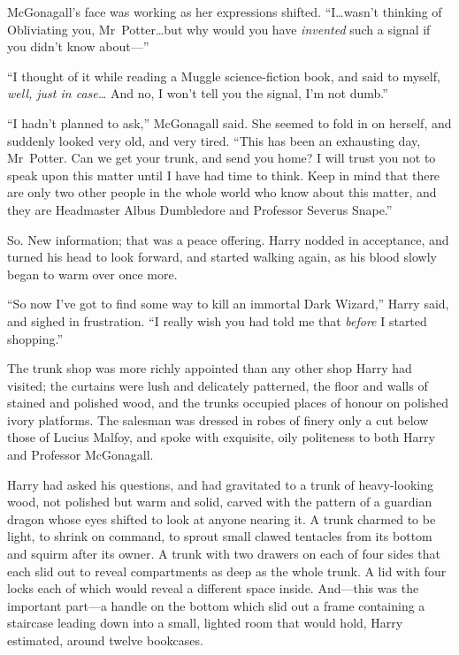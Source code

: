 McGonagall’s face was working as her expressions shifted. “I…wasn’t thinking of Obliviating you, Mr~Potter…but why would you have \emph{invented} such a signal if you didn’t know about—”

“I thought of it while reading a Muggle science-fiction book, and said to myself, \emph{well, just in case…} And no, I won’t tell you the signal, I’m not dumb.”

“I hadn’t planned to ask,” McGonagall said. She seemed to fold in on herself, and suddenly looked very old, and very tired. “This has been an exhausting day, Mr~Potter. Can we get your trunk, and send you home? I will trust you not to speak upon this matter until I have had time to think. Keep in mind that there are only two other people in the whole world who know about this matter, and they are Headmaster Albus Dumbledore and Professor Severus Snape.”

So. New information; that was a peace offering. Harry nodded in acceptance, and turned his head to look forward, and started walking again, as his blood slowly began to warm over once more.

“So now I’ve got to find some way to kill an immortal Dark Wizard,” Harry said, and sighed in frustration. “I really wish you had told me that \emph{before} I started shopping.”

\later

The trunk shop was more richly appointed than any other shop Harry had visited; the curtains were lush and delicately patterned, the floor and walls of stained and polished wood, and the trunks occupied places of honour on polished ivory platforms. The salesman was dressed in robes of finery only a cut below those of Lucius Malfoy, and spoke with exquisite, oily politeness to both Harry and Professor McGonagall.

Harry had asked his questions, and had gravitated to a trunk of heavy-looking wood, not polished but warm and solid, carved with the pattern of a guardian dragon whose eyes shifted to look at anyone nearing it. A trunk charmed to be light, to shrink on command, to sprout small clawed tentacles from its bottom and squirm after its owner. A trunk with two drawers on each of four sides that each slid out to reveal compartments as deep as the whole trunk. A lid with four locks each of which would reveal a different space inside. And—this was the important part—a handle on the bottom which slid out a frame containing a staircase leading down into a small, lighted room that would hold, Harry estimated, around twelve bookcases.

